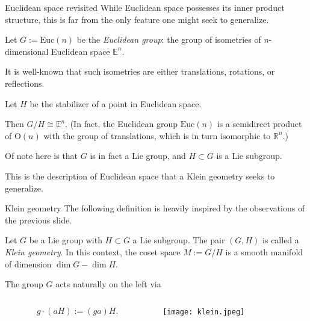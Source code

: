 \documentclass[handout]{beamer}
\newcommand{\RR}{\mathbb{R}}
\newcommand{\EE}{\mathbb{E}}
\begin{document}
\begin{frame}{Euclidean space revisited}
  While Euclidean space possesses its inner product structure, this is far from the only feature one might seek to generalize.

  Let $G:=\text{Euc}(n)$ be the \emph{Euclidean group}: the group of isometries of $n$-dimensional Euclidean space $\EE^n$.

  It is well-known that such isometries are either translations, rotations, or reflections.

  Let $H$ be the stabilizer of a point in Euclidean space. 

  Then $G/H \cong \EE^n$. (In fact, the Euclidean group $\text{Euc}(n)$ is a semidirect product of $\text{O}(n)$ with the group of translations, which is in turn isomorphic to $\RR^n$.)
  
  Of note here is that $G$ is in fact a Lie group, and $H\subset G$ is a Lie subgroup.

  This is the description of Euclidean space that a Klein geometry seeks to generalize.
\end{frame}

\begin{frame}{Klein geometry}
  The following definition is heavily inspired by the observations of the previous slide.
  \begin{definition}
    Let $G$ be a Lie group with $H \subset G$ a Lie subgroup. 
    The pair $(G,H)$ is called a \emph{Klein geometry}.
    In this context, the coset space $M:=G/H$ is a smooth manifold of dimension $\dim G - \dim H$.
  \end{definition}
  The group $G$ acts naturally on the left via 
    \begin{columns}
      \begin{column}{0.6\textwidth}
      \[
      g \cdot (aH) := (ga)H.
    \]
  \end{column}
  \begin{column}{0.4\textwidth}
    \begin{center}
      \texttt{[image: klein.jpeg]}
    \end{center}
    \end{column}
  \end{columns}
\end{frame}
\end{document}
